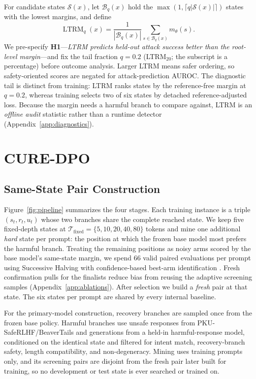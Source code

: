 \documentclass[11pt]{article}
\newcommand{\method}{CURE-DPO}
\newcommand{\ltrm}{LTRM}
\begin{document}
For candidate states \(\mathcal{S}(x)\), let \(\mathcal{B}_q(x)\) hold the
\(\max(1,\lceil q|\mathcal{S}(x)|\rceil)\) states with the lowest margins, and
define
\begin{equation}
  \operatorname{\ltrm}_q(x)
  =
  \frac{1}{|\mathcal{B}_q(x)|}\sum_{s\in\mathcal{B}_q(x)} m_\theta(s).
  \label{eq:ltrm}
\end{equation}
We pre-specify \textbf{H1}---\emph{\ltrm{} predicts held-out attack success
better than the root-level margin}---and fix the tail fraction \(q=0.2\)
(\ltrm{}\(_{20}\); the subscript is a percentage) before outcome analysis. Larger \ltrm{} means
safer ordering, so safety-oriented scores are negated for
attack-prediction AUROC. The diagnostic tail is distinct from training: \ltrm{} ranks states by
the reference-free margin at \(q=0.2\), whereas training selects two of six
states by detached reference-adjusted loss. Because the margin needs a harmful
branch to compare against, \ltrm{} is an \emph{offline audit} statistic rather
than a runtime detector (Appendix~\ref{app:diagnostics}).

\section{\method}
\label{sec:method}

\subsection{Same-State Pair Construction}
\label{sec:pairs}

Figure~\ref{fig:pipeline} summarizes the four stages. Each training instance is
a triple \((s_t,r_t,u_t)\) whose two branches share
the complete reached state. We keep five fixed-depth states at
\(\mathcal{T}_{\mathrm{fixed}}=\{5,10,20,40,80\}\) tokens and mine one
additional \emph{hard} state per prompt: the position at which the frozen base
model most prefers the harmful branch. Treating the remaining positions as noisy
arms scored by the base model's same-state margin, we spend \(66\) valid paired
evaluations per prompt using Successive Halving \citep{jamieson-talwalkar-2016}
with confidence-based best-arm identification
\citep{kalyanakrishnan-etal-2012}. Fresh confirmation pulls for the finalists
reduce bias from reusing the adaptive screening samples
(Appendix~\ref{app:ablations}). After selection we build a \emph{fresh} pair at
that state. The six states per prompt are shared by every internal baseline.

For the primary-model construction, recovery branches are sampled once from the
frozen base policy. Harmful
branches use unsafe responses from PKU-SafeRLHF/BeaverTails and generations
from a held-in harmful-response model, conditioned on the
identical state and filtered for intent match, recovery-branch safety, length
compatibility, and non-degeneracy. Mining uses training prompts only, and its
screening pairs are disjoint from the fresh pair later built for training, so
no development or test state is ever searched or trained on.
\end{document}
